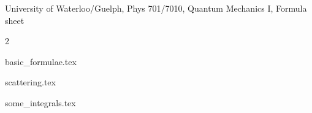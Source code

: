 \documentclass[11pt]{article}
\begin{document}
\begin{center}
{\large University of Waterloo/Guelph, Phys 701/7010, Quantum Mechanics I, Formula sheet}
\end{center}

\begin{multicols}{2}

{basic_formulae.tex}

\columnbreak






{scattering.tex}






{some_integrals.tex}



\end{multicols}








\end{document}
